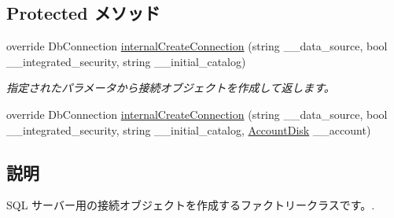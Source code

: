 \subsection*{Protected メソッド}
\begin{DoxyCompactItemize}
\item 
override DbConnection \hyperlink{classlazurite_1_1etherial_1_1_s_q_l_client_connection_factory_ae90709eac75512aafebd8d81290e8100}{internalCreateConnection} (string \_\-\_\-data\_\-source, bool \_\-\_\-integrated\_\-security, string \_\-\_\-initial\_\-catalog)
\begin{DoxyCompactList}\small\item\em 指定されたパラメータから接続オブジェクトを作成して返します。 \item\end{DoxyCompactList}\item 
override DbConnection \hyperlink{classlazurite_1_1etherial_1_1_s_q_l_client_connection_factory_a36d7093be17f200a15c05bf63fd1eeb1}{internalCreateConnection} (string \_\-\_\-data\_\-source, bool \_\-\_\-integrated\_\-security, string \_\-\_\-initial\_\-catalog, \hyperlink{classlazurite_1_1etherial_1_1utils_1_1_connection_factory_1_1_account_disk}{AccountDisk} \_\-\_\-account)
\end{DoxyCompactItemize}


\subsection{説明}
SQL サーバー用の接続オブジェクトを作成するファクトリークラスです。. 

